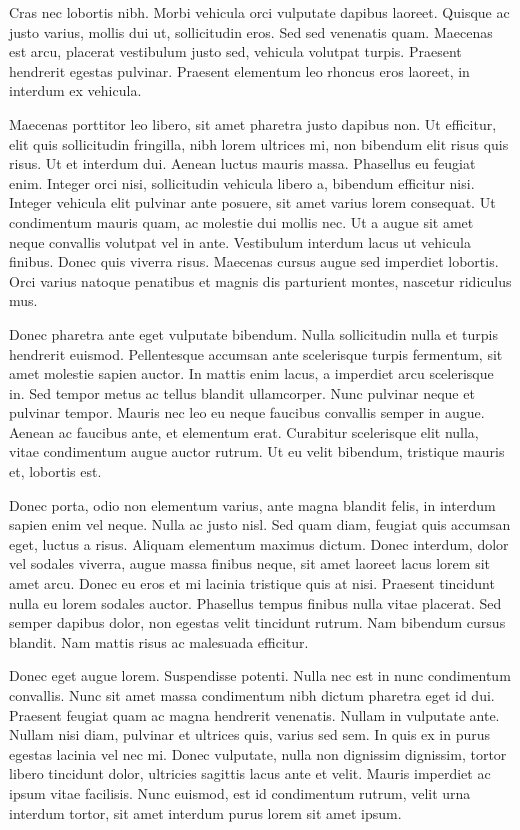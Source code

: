 \documentclass[10pt]{article}
\begin{document}
	Cras nec lobortis nibh. Morbi vehicula orci vulputate dapibus laoreet. Quisque ac justo varius, mollis dui ut, sollicitudin eros. Sed sed venenatis quam. Maecenas est arcu, placerat vestibulum justo sed, vehicula volutpat turpis. Praesent hendrerit egestas pulvinar. Praesent elementum leo rhoncus eros laoreet, in interdum ex vehicula.
	
	Maecenas porttitor leo libero, sit amet pharetra justo dapibus non. Ut efficitur, elit quis sollicitudin fringilla, nibh lorem ultrices mi, non bibendum elit risus quis risus. Ut et interdum dui. Aenean luctus mauris massa. Phasellus eu feugiat enim. Integer orci nisi, sollicitudin vehicula libero a, bibendum efficitur nisi. Integer vehicula elit pulvinar ante posuere, sit amet varius lorem consequat. Ut condimentum mauris quam, ac molestie dui mollis nec. Ut a augue sit amet neque convallis volutpat vel in ante. Vestibulum interdum lacus ut vehicula finibus. Donec quis viverra risus. Maecenas cursus augue sed imperdiet lobortis. Orci varius natoque penatibus et magnis dis parturient montes, nascetur ridiculus mus.
	
	Donec pharetra ante eget vulputate bibendum. Nulla sollicitudin nulla et turpis hendrerit euismod. Pellentesque accumsan ante scelerisque turpis fermentum, sit amet molestie sapien auctor. In mattis enim lacus, a imperdiet arcu scelerisque in. Sed tempor metus ac tellus blandit ullamcorper. Nunc pulvinar neque et pulvinar tempor. Mauris nec leo eu neque faucibus convallis semper in augue. Aenean ac faucibus ante, et elementum erat. Curabitur scelerisque elit nulla, vitae condimentum augue auctor rutrum. Ut eu velit bibendum, tristique mauris et, lobortis est.
	
	Donec porta, odio non elementum varius, ante magna blandit felis, in interdum sapien enim vel neque. Nulla ac justo nisl. Sed quam diam, feugiat quis accumsan eget, luctus a risus. Aliquam elementum maximus dictum. Donec interdum, dolor vel sodales viverra, augue massa finibus neque, sit amet laoreet lacus lorem sit amet arcu. Donec eu eros et mi lacinia tristique quis at nisi. Praesent tincidunt nulla eu lorem sodales auctor. Phasellus tempus finibus nulla vitae placerat. Sed semper dapibus dolor, non egestas velit tincidunt rutrum. Nam bibendum cursus blandit. Nam mattis risus ac malesuada efficitur.
	
	Donec eget augue lorem. Suspendisse potenti. Nulla nec est in nunc condimentum convallis. Nunc sit amet massa condimentum nibh dictum pharetra eget id dui. Praesent feugiat quam ac magna hendrerit venenatis. Nullam in vulputate ante. Nullam nisi diam, pulvinar et ultrices quis, varius sed sem. In quis ex in purus egestas lacinia vel nec mi. Donec vulputate, nulla non dignissim dignissim, tortor libero tincidunt dolor, ultricies sagittis lacus ante et velit. Mauris imperdiet ac ipsum vitae facilisis. Nunc euismod, est id condimentum rutrum, velit urna interdum tortor, sit amet interdum purus lorem sit amet ipsum.
	
\end{document}
